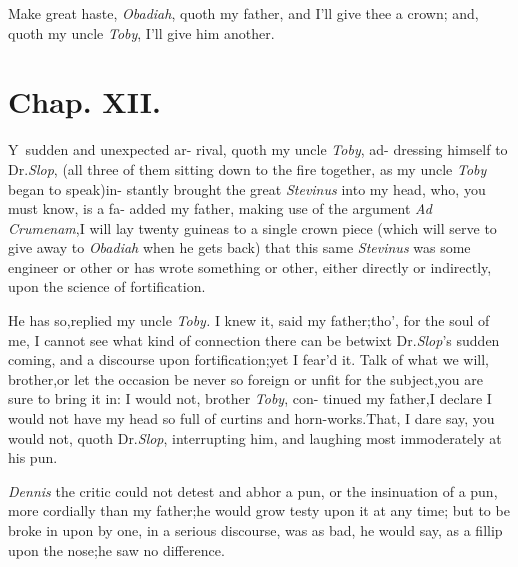 \documentclass{article}
\begin{document}
\tsh Make great haste, \textit{Obadiah}, quoth my father,
and I’ll give thee a crown;\tsk\break
and, quoth my uncle \textit{Toby}, I’ll give him another.

\bigskip

\section{Chap. XII.}

\lettrine{Y}{\,} sudden and unexpected ar-\break
rival, quoth my uncle \textit{Toby}, ad-\break
dressing himself to Dr.\@ \textit{Slop},
(all three of them sitting down to the fire together, as my uncle
\textit{Toby} began to speak)\tsk in-\break
stantly brought the great \textit{Stevinus} into\break
my head, who, you must know, is a fa-\pb
{}
added my father, making use of the ar\-gument \textit{Ad
Crumenam},\tsh I will lay\break
twenty guineas to a single crown piece (which will serve to
give away to \textit{Obadiah} when he gets back) that this
same \textit{Stevinus} was some engineer or other\tsk\break
or has wrote something or other, either directly or indirectly,
upon the science of\break
fortification.

He has so,\tsk replied my uncle \textit{Toby.}\tsk\break
I knew it, said my father;\tsk tho’, for the soul of me, I cannot see what kind
of connection there can be betwixt Dr.\@ \textit{Slop}’s sudden
coming, and a discourse upon fortification;\tsk yet I
fear’d it.\tsk\break
Talk of what we will, brother,\tsk or let the occasion be
never so foreign or unfit for the subject,\tsk you are sure
to bring it in: I would not, brother \textit{Toby}, con-\pb
tinued my father,\tsh I declare I would not have my head
so full of curtins and horn-works.\tsh That, I dare say, you
would not, quoth Dr.\@ \textit{Slop}, interrupting him, and
laughing most immoderately at\break
his pun.

\textit{Dennis} the critic could not detest and abhor a pun, or
the insinuation of a pun, more cordially than my father;\tsh he
would grow testy upon it at any time;\tsk\break
but to be broke in upon by one, in a serious discourse, was
as bad, he would say, as a fillip upon the nose;\tsh he saw\break
no difference.
\end{document}
